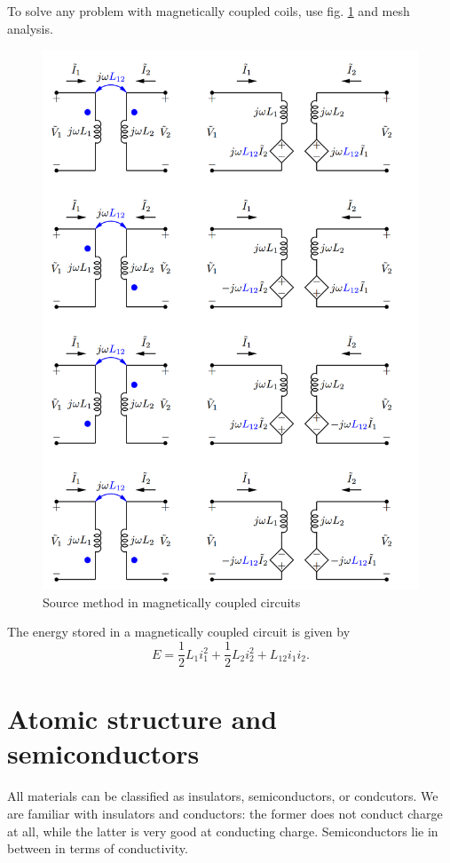\documentclass[nobib]{tufte-handout}
\begin{document}
To solve any problem with magnetically coupled coils, use fig. 
\ref{fig:magchart} and mesh analysis. 
\begin{figure}
    \begin{center}
        \caption{Source method in magnetically coupled circuits}
        \label{fig:magchart}
        \includegraphics{images/magchart.png}
    \end{center}
\end{figure}

The energy stored in a magnetically coupled 
circuit is given by 
\[E = \frac{1}{2}L_1i_1^2 + \frac{1}{2}L_2i_2^2 + L_{12}i_1i_2.\]

\section{Atomic structure and semiconductors}
All materials can be classified as insulators, semiconductors, 
or condcutors. We are familiar with insulators and conductors: 
the former does not conduct charge at all, while the latter 
is very good at conducting charge. Semiconductors lie in between 
in terms of conductivity. 
\end{document}
